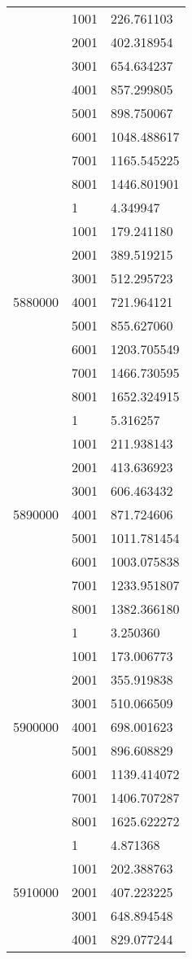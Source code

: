 \begin{table}[htb!]
\begin{tabular}{lll}
 & 1001 & 226.761103 \\
 & 2001 & 402.318954 \\
 & 3001 & 654.634237 \\
 & 4001 & 857.299805 \\
 & 5001 & 898.750067 \\
 & 6001 & 1048.488617 \\
 & 7001 & 1165.545225 \\
 & 8001 & 1446.801901 \\
\multirow[c]{9}{*}{5880000} & 1 & 4.349947 \\
 & 1001 & 179.241180 \\
 & 2001 & 389.519215 \\
 & 3001 & 512.295723 \\
 & 4001 & 721.964121 \\
 & 5001 & 855.627060 \\
 & 6001 & 1203.705549 \\
 & 7001 & 1466.730595 \\
 & 8001 & 1652.324915 \\
\multirow[c]{9}{*}{5890000} & 1 & 5.316257 \\
 & 1001 & 211.938143 \\
 & 2001 & 413.636923 \\
 & 3001 & 606.463432 \\
 & 4001 & 871.724606 \\
 & 5001 & 1011.781454 \\
 & 6001 & 1003.075838 \\
 & 7001 & 1233.951807 \\
 & 8001 & 1382.366180 \\
\multirow[c]{9}{*}{5900000} & 1 & 3.250360 \\
 & 1001 & 173.006773 \\
 & 2001 & 355.919838 \\
 & 3001 & 510.066509 \\
 & 4001 & 698.001623 \\
 & 5001 & 896.608829 \\
 & 6001 & 1139.414072 \\
 & 7001 & 1406.707287 \\
 & 8001 & 1625.622272 \\
\multirow[c]{9}{*}{5910000} & 1 & 4.871368 \\
 & 1001 & 202.388763 \\
 & 2001 & 407.223225 \\
 & 3001 & 648.894548 \\
 & 4001 & 829.077244 \\

\end{tabular}
\end{table}
